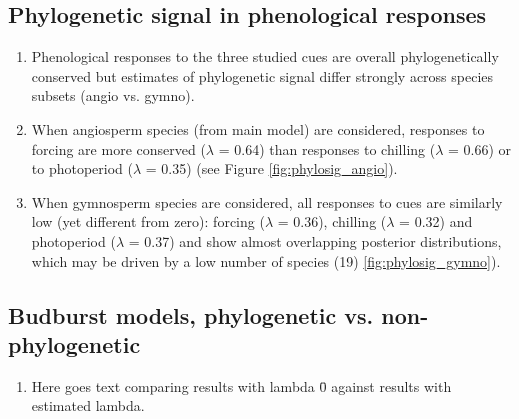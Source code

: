 \documentclass{article}\usepackage[]{graphicx}\usepackage[]{color}
\begin{document}
\subsection*{Phylogenetic signal in phenological responses}
\begin{enumerate}
\item Phenological responses to the three studied cues are overall phylogenetically conserved but estimates of phylogenetic signal differ strongly across species subsets (angio vs. gymno).
\item When angiosperm species (from main model) are considered, responses to forcing are more conserved ($\lambda$ = 0.64) than responses to chilling ($\lambda$ = 0.66) or to photoperiod ($\lambda$ = 0.35) (see Figure \ref{fig:phylosig_angio}).  

\item When gymnosperm species are considered, all responses to cues are similarly low (yet different from zero): forcing ($\lambda$ = 0.36), chilling ($\lambda$ = 0.32) and photoperiod ($\lambda$ = 0.37) and show almost overlapping posterior distributions, which may be driven by a low number of species (19) \ref{fig:phylosig_gymno}).  


\end{enumerate}


\subsection*{Budburst models, phylogenetic vs. non-phylogenetic}
\begin{enumerate}
\item Here goes text comparing results with lambda \= 0 against results with estimated lambda.
\end{enumerate}



\end{document}
